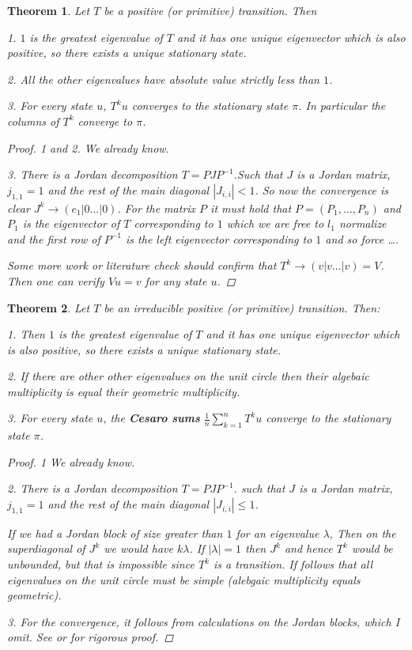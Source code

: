 \documentclass[a4paper,10pt]{article}
\theoremstyle{definition}
\theoremstyle{remark}
\theoremstyle{plain}
\newtheorem{thm}{Theorem}[section]
\begin{document}
\begin{thm}
\label{thm:transition_ev}
Let $T$ be a positive (or primitive) transition. Then 

1. $1$ is the greatest eigenvalue
of $T$ and it has one unique eigenvector which is also positive,
so there exists a unique stationary state.

2. All the other eigenvalues have absolute value strictly less than $1$.

3. For every state $u$, $T^ku$ converges to the stationary state $\pi$.
In particular the columns of $T^k$ converge to $\pi$.

\begin{proof}
1 and 2. We already know.

3. There is a Jordan decomposition $T = PJP^{-1}$.Such that $J$ is a Jordan
matrix, $j_{1,1} = 1$ and the rest of the main diagonal $|J_{i,i}| <1$.
So now the convergence is clear $J^k \to (e_1 | 0 \dots | 0)$.
For the matrix $P$ it must hold that $P = (P_1, \dots, P_n)$ and $P_1$ is the
eigenvector of $T$ corresponding to $1$ which we are free to $l_1$ normalize 
and the first row of $P^{-1}$ is the
left eigenvector corresponding to $1$ and so force \dots.

Some more work or literature check should confirm that $T^k \to (v|v\dots|v) = V$.
Then one can verify $Vu = v$ for any state $u$.
\end{proof}
\end{thm}

\begin{thm}
\label{thm:transition_irr_ev}
Let $T$ be an irreducible positive (or primitive) transition. 
Then:

1. Then $1$ is the greatest eigenvalue
of $T$ and it has one unique eigenvector which is also positive,
so there exists a unique stationary state.

2. If there are other other eigenvalues on the unit circle then their algebaic
multiplicity is equal their geometric multiplicity.

3. For every state $u$, the \textbf{Cesaro sums} 
$\frac{1}{n}\sum_{k=1}^n T^ku$ converge to the stationary state $\pi$.

\begin{proof}
1 We already know.

2. There is a Jordan decomposition $T = PJP^{-1}$. such that $J$ is a Jordan
matrix, $j_{1,1} = 1$ and the rest of the main diagonal $|J_{i,i}| \leq 1$.

If we had a Jordan block of size greater than $1$ for an eigenvalue $\lambda$,
Then on the superdiagonal of $J^k$ we would have $k \lambda$. If $|\lambda| =1$
then $J^k$ and hence $T^k$ would be unbounded, but that is impossible since
$T^k$ is a transition. If follows that all eigenvalues on the unit circle must
be simple (alebgaic multiplicity equals geometric).

3. For the convergence, it follows from calculations on the Jordan blocks, which
I omit. See \textcite{meyer2000matrix} or \textcite{serre2010matrices}
for rigorous proof.
\end{proof}
\end{thm}
\end{document}
